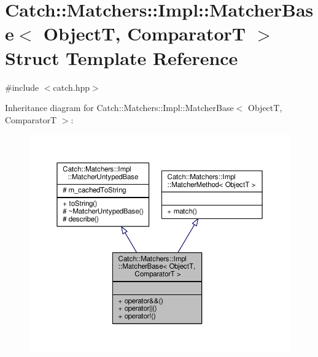 \hypertarget{struct_catch_1_1_matchers_1_1_impl_1_1_matcher_base}{\section{Catch\-:\-:Matchers\-:\-:Impl\-:\-:Matcher\-Base$<$ Object\-T, Comparator\-T $>$ Struct Template Reference}
\label{struct_catch_1_1_matchers_1_1_impl_1_1_matcher_base}
}


{\ttfamily \#include $<$catch.\-hpp$>$}



Inheritance diagram for Catch\-:\-:Matchers\-:\-:Impl\-:\-:Matcher\-Base$<$ Object\-T, Comparator\-T $>$\-:
\nopagebreak
\begin{figure}[H]
\begin{center}
\leavevmode
\includegraphics[width=350pt]{struct_catch_1_1_matchers_1_1_impl_1_1_matcher_base__inherit__graph}
\end{center}
\end{figure}


